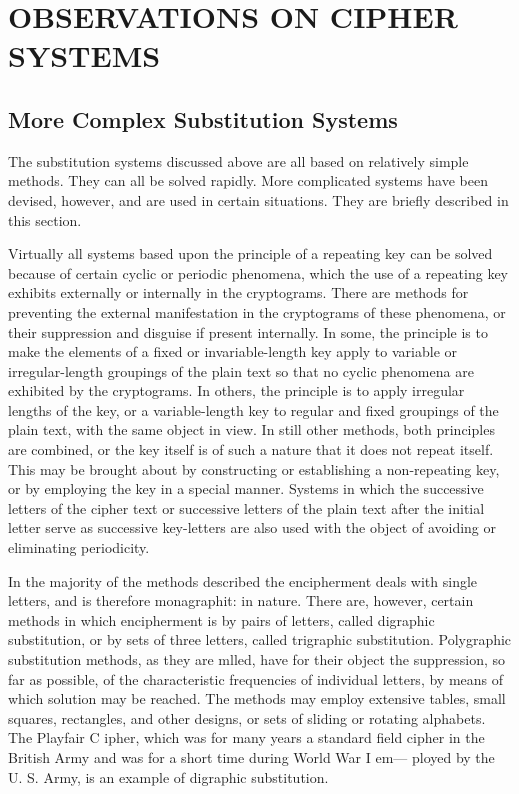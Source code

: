 \section{OBSERVATIONS ON CIPHER SYSTEMS}

\subsection{More Complex Substitution Systems}

\mypara The substitution systems discussed above are all based on relatively
simple methods. They can all be solved rapidly. More complicated systems have been devised, however, and are used in certain situations.
They are brieﬂy described in this section.

\mypara Virtually all systems based upon the principle of a repeating key
can be solved because of certain cyclic or periodic phenomena, which the
use of a repeating key exhibits externally or internally in the cryptograms. There are methods for preventing the external manifestation in
the cryptograms of these phenomena, or their suppression and disguise
if present internally. In some, the principle is to make the elements of a
ﬁxed or invariable-length key apply to variable or irregular-length groupings of the plain text so that no cyclic phenomena are exhibited by the
cryptograms. In others, the principle is to apply irregular lengths of the
key, or a variable-length key to regular and ﬁxed groupings of the plain
text, with the same object in view. In still other methods, both principles
are combined, or the key itself is of such a nature that it does not repeat
itself. This may be brought about by constructing or establishing a non-repeating key, or by employing the key in a special manner. Systems in
which the successive letters of the cipher text or successive letters of the
plain text after the initial letter serve as successive key-letters are also
used with the object of avoiding or eliminating periodicity.

\mypara In the majority of the methods described the encipherment deals
with single letters, and is therefore monagraphit: in nature. There are,
however, certain methods in which encipherment is by pairs of letters,
called digraphic substitution, or by sets of three letters, called trigraphic
substitution. Polygraphic substitution methods, as they are mlled, have
for their object the suppression, so far as possible, of the characteristic
frequencies of individual letters, by means of which solution may be
reached. The methods may employ extensive tables, small squares,
rectangles, and other designs, or sets of sliding or rotating alphabets.
The Playfair C ipher, which was for many years a standard ﬁeld cipher in
the British Army and was for a short time during World War I em—
ployed by the U. S. Army, is an example of digraphic substitution.

